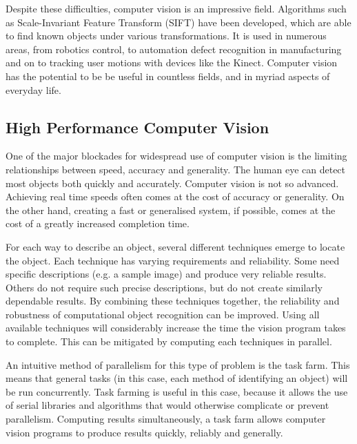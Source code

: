 \documentclass[../main.tex]{subfiles}
\begin{document}
    Despite these difficulties, computer vision is an impressive field.
    Algorithms such as Scale-Invariant Feature Transform (SIFT) have been developed, which are able to find known objects under various transformations.
    It is used in numerous areas, from robotics control, to automation defect recognition in manufacturing and on to tracking user motions with devices like the Kinect.
    Computer vision has the potential to be be useful in countless fields, and in myriad aspects of everyday life.


    \subsection{High Performance Computer Vision}
    One of the major blockades for widespread use of computer vision is the limiting relationships between speed, accuracy and generality.
    The human eye can detect most objects both quickly and accurately.
    Computer vision is not so advanced.
    Achieving real time speeds often comes at the cost of accuracy or generality.
    On the other hand, creating a fast or generalised system, if possible, comes at the cost of a greatly increased completion time.
    
    For each way to describe an object, several different techniques emerge to locate the object.
    Each technique has varying requirements and reliability.
    Some need specific descriptions (e.g. a sample image) and produce very reliable results.
    Others do not require such precise descriptions, but do not create similarly dependable results.
    By combining these techniques together, the reliability and robustness of computational object recognition can be improved.
    Using all available techniques will considerably increase the time the vision program takes to complete.
    This can be mitigated by computing each techniques in parallel.

    An intuitive method of parallelism for this type of problem is the task farm.
    This means that general tasks (in this case, each method of identifying an object) will be run concurrently.
    Task farming is useful in this case, because it allows the use of serial libraries and algorithms that would otherwise complicate or prevent parallelism.
    Computing results simultaneously, a task farm allows computer vision programs to produce results quickly, reliably and generally.
\end{document}
